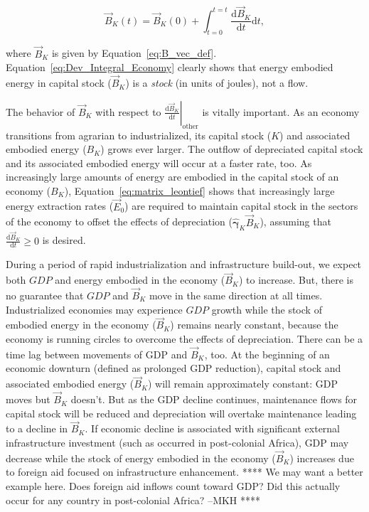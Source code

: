 \begin{equation} \label{eq:Dev_Integral_Economy}
	\vec{B}_{K}(t) 
	= \vec{B}_{K}(0) 
	+ \int_{t=0}^{t=t} \frac{\mathrm{d}\vec{B}_{K}}{\mathrm{d}t}\mathrm{d}t,
\end{equation}

\noindent{}where $\vec{B}_{K}$ is given by Equation~\ref{eq:B_vec_def}.
Equation~\ref{eq:Dev_Integral_Economy} clearly shows
that energy embodied energy in capital stock ($\vec{B}_{K}$) 
is a \emph{stock} (in units of joules), not a flow.

The behavior of $\vec{B}_{K}$ with respect to
$\left. \frac{\mathrm{d}\vec{B}_{K}}{\mathrm{d}t} \right|_{\mathrm{other}}$ 
is vitally important. 
As an economy transitions from agrarian to industrialized, 
its capital stock ($K$) and associated embodied energy ($B_{K}$)
grows ever larger. 
The outflow of depreciated capital stock and its associated embodied energy 
will occur at a faster rate, too.
As increasingly large amounts of energy are embodied 
in the capital stock of an economy ($B_{K}$), 
Equation~\ref{eq:matrix_leontief} shows that
increasingly large energy extraction rates ($\vec{E}_{0}$) 
are required to maintain capital stock 
in the sectors of the economy
to offset the effects of depreciation 
($\hat{\bm{\gamma}}_{K} \vec{B}_{K}$),
assuming that $\frac{\mathrm{d}\vec{B}_{K}}{\mathrm{d}t} \ge 0$ 
is desired. 

During a period of rapid industrialization and infrastructure build-out, 
we expect both $GDP$ and energy embodied in the economy ($\vec{B}_{K}$)
to increase.
But, there is no guarantee that $GDP$ and $\vec{B}_{K}$ move 
in the same direction at all times.
Industrialized economies may experience $GDP$ growth while 
the stock of embodied energy in the economy ($\vec{B}_{K}$) remains nearly constant,
because the economy is running circles to overcome the effects of depreciation.
There can be a time lag between movements of GDP and $\vec{B}_{K}$, too.
At the beginning of an economic downturn (defined as prolonged GDP reduction),
capital stock and associated embodied energy ($\vec{B}_{K}$) will remain approximately constant:
GDP moves but $\vec{B}_{K}$ doesn't.
But as the GDP decline continues, 
maintenance flows for capital stock will be reduced
and depreciation will overtake maintenance leading to a decline in $\vec{B}_{K}$. 
If economic decline is associated with significant external 
infrastructure investment (such as occurred in post-colonial Africa),
GDP may decrease 
while the stock of energy embodied in the economy ($\vec{B}_{K}$) increases 
due to foreign aid focused on infrastructure enhancement.
**** We may want a better example here.
Does foreign aid inflows count toward GDP\@?
Did this actually occur for any country in post-colonial Africa? 
--MKH ****

